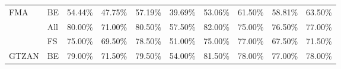 \begin{table}[H]
{\begin{tabular}{llllllllll}
    \multirow{-3}{*}{FMA}   & \multicolumn{1}{l|}{\cellcolor[HTML]{EFEFEF}BE}  & \cellcolor[HTML]{EFEFEF}54.44\% & \cellcolor[HTML]{EFEFEF}47.75\% & \cellcolor[HTML]{EFEFEF}57.19\% & \cellcolor[HTML]{EFEFEF}39.69\% & \cellcolor[HTML]{EFEFEF}53.06\% & \cellcolor[HTML]{EFEFEF}61.50\% & \cellcolor[HTML]{EFEFEF}58.81\% & \cellcolor[HTML]{EFEFEF}63.50\% \\ \cline{1-2}
                            & \multicolumn{1}{l|}{All}                         & 80.00\%                         & 71.00\%                         & 80.50\%                         & 57.50\%                         & 82.00\%                         & 75.00\%                         & 76.50\%                         & 77.00\%                         \\
                            & \multicolumn{1}{l|}{\cellcolor[HTML]{EFEFEF}FS}  & \cellcolor[HTML]{EFEFEF}75.00\% & \cellcolor[HTML]{EFEFEF}69.50\% & \cellcolor[HTML]{EFEFEF}78.50\% & \cellcolor[HTML]{EFEFEF}51.00\% & \cellcolor[HTML]{EFEFEF}75.00\% & \cellcolor[HTML]{EFEFEF}77.00\% & \cellcolor[HTML]{EFEFEF}67.50\% & \cellcolor[HTML]{EFEFEF}71.50\% \\
    \multirow{-3}{*}{GTZAN} & \multicolumn{1}{l|}{BE}                          & 79.00\%                         & 71.50\%                         & 79.50\%                         & 54.00\%                         & 81.50\%                         & 78.00\%                         & 77.00\%                         & 78.00\%                        
    \end{tabular}}
\end{table}

